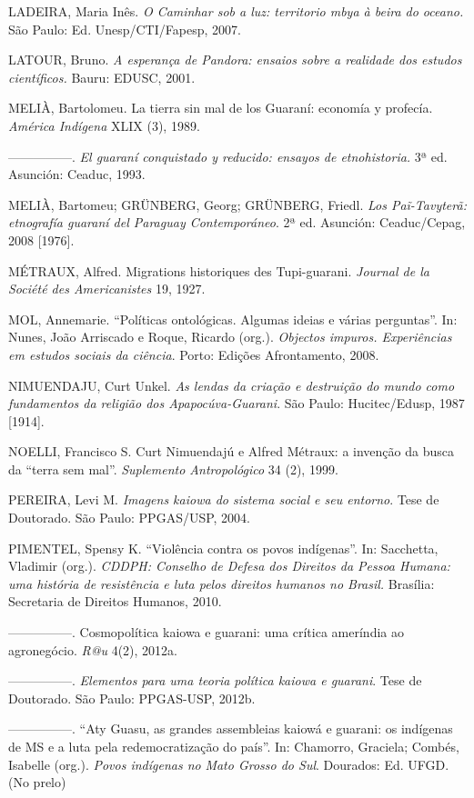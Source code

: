 LADEIRA, Maria Inês. \emph{O Caminhar sob a luz: territorio mbya à beira
do oceano.} São Paulo: Ed. Unesp/CTI/Fapesp, 2007.

LATOUR, Bruno. \emph{A esperança de Pandora: ensaios sobre a realidade
dos estudos científicos.} Bauru: EDUSC, 2001.

MELIÀ, Bartolomeu. La tierra sin mal de los Guaraní: economía y
profecía. \emph{América Indígena} XLIX (3), 1989.

---------------. \emph{El guaraní conquistado y reducido: ensayos de
etnohistoria.} 3ª ed. Asunción: Ceaduc, 1993.

MELIÀ, Bartomeu; GRÜNBERG, Georg; GRÜNBERG, Friedl. \emph{Los
Paĩ-Tavyterã: etnografía guaraní del Paraguay Contemporáneo}. 2ª ed.
Asunción: Ceaduc/Cepag, 2008 {[}1976{]}.

MÉTRAUX, Alfred. Migrations historiques des Tupi-guarani. \emph{Journal
de la Société des Americanistes} 19, 1927.

MOL, Annemarie. ``Políticas ontológicas. Algumas ideias e várias
perguntas''. In: Nunes, João Arriscado e Roque, Ricardo (org.).
\emph{Objectos impuros. Experiências em estudos sociais da ciência}.
Porto: Edições Afrontamento, 2008.

NIMUENDAJU, Curt Unkel. \emph{As lendas da criação e destruição do mundo
como fundamentos da religião dos Apapocúva-Guarani}. São Paulo:
Hucitec/Edusp, 1987 {[}1914{]}.

NOELLI, Francisco S. Curt Nimuendajú e Alfred Métraux: a invenção da
busca da ``terra sem mal''. \emph{Suplemento Antropológico} 34 (2),
1999.

PEREIRA, Levi M. \emph{Imagens kaiowa do sistema social e seu entorno}.
Tese de Doutorado. São Paulo: PPGAS/USP, 2004.

PIMENTEL, Spensy K. ``Violência contra os povos indígenas''. In:
Sacchetta, Vladimir (org.). \emph{CDDPH: Conselho de Defesa dos Direitos
da Pessoa Humana: uma história de resistência e luta pelos direitos
humanos no Brasil.} Brasília: Secretaria de Direitos Humanos, 2010.

---------------. Cosmopolítica kaiowa e guarani: uma crítica ameríndia
ao agronegócio. \emph{R@u} 4(2), 2012a.

---------------. \emph{Elementos para uma teoria política kaiowa e
guarani}. Tese de Doutorado. São Paulo: PPGAS-USP, 2012b.

---------------. ``Aty Guasu, as grandes assembleias kaiowá e guarani:
os indígenas de MS e a luta pela redemocratização do país''. In:
Chamorro, Graciela; Combés, Isabelle (org.). \emph{Povos indígenas no}
\emph{Mato Grosso do Sul}. Dourados: Ed. UFGD. (No prelo)

